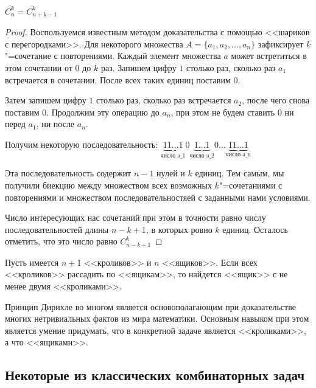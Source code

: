 \begin{theorem}
    $\displaystyle \overline{C_n^k} = C_{n + k - 1}^k$
\end{theorem}

\begin{proof}
    Воспользуемся известным методом доказательства с помощью 
    <<шариков с перегородками>>. Для некоторого множества $A = \{a_1, a_2, \dots, a_n\}$
    зафиксирует $k$"=сочетание с повторениями. Каждый элемент множества $a$ может 
    встретиться в этом сочетании от $0$ до $k$ раз. 
    Запишем цифру $1$ столько раз, сколько раз $a_1$ встречается
    в сочетании. После всех таких единиц поставим $0$. 
    
    Затем запишем цифру
    $1$ столько раз, сколько раз встречается $a_2$, после чего снова
    поставим $0$. Продолжим эту операцию до $a_n$, при этом не будем ставить $0$
    ни перед $a_1$, ни после $a_n$.
    
    Получим некоторую последовательность: $\underbrace{11\dots1}_{\text{число a_1}}0
    \underbrace{1\dots1}_{\text{число a_2}}0\dots\underbrace{11\dots1}_\text{число a_n}$

    Эта последовательность содержит $n - 1$ нулей и $k$ единиц. Тем самым, 
    мы получили биекцию между множеством всех возможных $k$"=сочетаниями с повторениями и множеством последовательностяей
    с заданными нами условиями. 
    
    Число интересующих нас сочетаний при этом в точности
    равно числу последовательностей длины $n - k + 1$, в которых ровно $k$ единиц.
    Осталось отметить, что это число равно $C_{n - k + 1}^k$
\end{proof}

\begin{theorem}
    Пусть имеется $n + 1$ <<кроликов>> и $n$ <<ящиков>>. 
    Если всех <<кроликов>> рассадить по <<ящикам>>, 
    то найдется <<ящик>> с не менее двумя <<кроликами>>.
\end{theorem}

Принцип Дирихле во многом является основополагающим при доказательстве многих
нетривиальных фактов из мира математики. Основным навыком при этом является
умение придумать, что в конкретной задаче является <<кроликами>>, а что
<<ящиками>>.

\subsection{Некоторые из классических комбинаторных задач}

